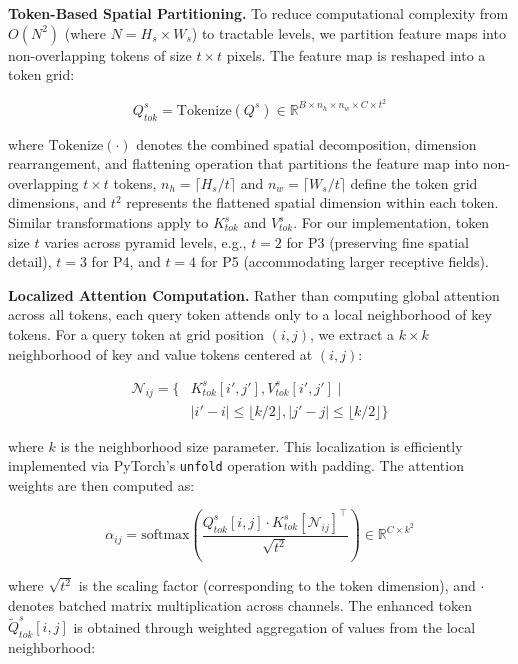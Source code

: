 \documentclass[journal,twoside,web]{ieeecolor}
\begin{document}
\textbf{Token-Based Spatial Partitioning.} To reduce computational complexity from $O(N^2)$ (where $N = H_s \times W_s$) to tractable levels, we partition feature maps into non-overlapping tokens of size $t \times t$ pixels. The feature map is reshaped into a token grid:

\begin{equation}
Q^s_{tok} = \text{Tokenize}(Q^s) \in \mathbb{R}^{B \times n_h \times n_w \times C \times t^2}
\end{equation}

where $\text{Tokenize}(\cdot)$ denotes the combined spatial decomposition, dimension rearrangement, and flattening operation that partitions the feature map into non-overlapping $t \times t$ tokens, $n_h = \lceil H_s / t \rceil$ and $n_w = \lceil W_s / t \rceil$ define the token grid dimensions, and $t^2$ represents the flattened spatial dimension within each token. Similar transformations apply to $K^s_{tok}$ and $V^s_{tok}$. For our implementation, token size $t$ varies across pyramid levels, e.g., $t=2$ for P3 (preserving fine spatial detail), $t=3$ for P4, and $t=4$ for P5 (accommodating larger receptive fields).

\textbf{Localized Attention Computation.} Rather than computing global attention across all tokens, each query token attends only to a local neighborhood of key tokens. For a query token at grid position $(i, j)$, we extract a $k \times k$ neighborhood of key and value tokens centered at $(i, j)$:

\begin{equation}
\begin{aligned}
\mathcal{N}_{ij} = \{&K^s_{tok}[i', j'], V^s_{tok}[i', j'] \mid \\
&|i'-i| \leq \lfloor k/2 \rfloor, |j'-j| \leq \lfloor k/2 \rfloor\}
\end{aligned}
\end{equation}

where $k$ is the neighborhood size parameter. This localization is efficiently implemented via PyTorch's \texttt{unfold} operation with padding. The attention weights are then computed as:

\begin{equation}
\alpha_{ij} = \text{softmax}\left(\frac{Q^s_{tok}[i,j] \cdot K^s_{tok}[\mathcal{N}_{ij}]^\top}{\sqrt{t^2}}\right) \in \mathbb{R}^{C \times k^2}
\end{equation}

where $\sqrt{t^2}$ is the scaling factor (corresponding to the token dimension), and $\cdot$ denotes batched matrix multiplication across channels. The enhanced token $\widetilde{Q}^s_{tok}[i,j]$ is obtained through weighted aggregation of values from the local neighborhood:
\end{document}

